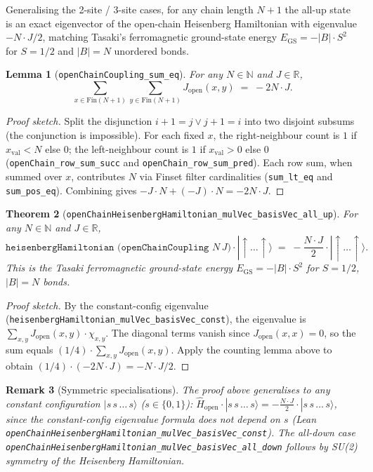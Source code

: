 \documentclass[a4paper,11pt]{article}
\newtheorem{theorem}{Theorem}
\newtheorem{lemma}[theorem]{Lemma}
\newtheorem{remark}[theorem]{Remark}
\begin{document}
Generalising the 2-site / 3-site cases, for any chain length
$N + 1$ the all-up state is an exact eigenvector of the open-chain
Heisenberg Hamiltonian with eigenvalue $-N\cdot J/2$, matching
Tasaki's ferromagnetic ground-state energy
$E_{\mathrm{GS}} = -|B|\cdot S^{2}$ for $S = 1/2$ and $|B| = N$
unordered bonds.

\begin{lemma}[\texttt{openChainCoupling\_sum\_eq}]
For any $N \in \mathbb{N}$ and $J \in \mathbb{R}$,
\[
  \sum_{x \in \mathrm{Fin}(N+1)} \sum_{y \in \mathrm{Fin}(N+1)}
    J_{\mathrm{open}}(x,y) \;=\; -2N\cdot J.
\]
\end{lemma}

\begin{proof}[Proof sketch]
Split the disjunction $i+1 = j \lor j+1 = i$ into two disjoint
subsums (the conjunction is impossible).  For each fixed $x$, the
right-neighbour count is $1$ if $x_{\mathrm{val}} < N$ else $0$; the
left-neighbour count is $1$ if $x_{\mathrm{val}} > 0$ else $0$
(\texttt{openChain\_row\_sum\_succ} and \texttt{openChain\_row\_sum\_pred}).
Each row sum, when summed over $x$, contributes $N$ via Finset
filter cardinalities (\texttt{sum\_lt\_eq} and \texttt{sum\_pos\_eq}).
Combining gives $-J\cdot N + (-J)\cdot N = -2N\cdot J$.
\end{proof}

\begin{theorem}[\texttt{openChainHeisenbergHamiltonian\_mulVec\_basisVec\_all\_up}]
For any $N \in \mathbb{N}$ and $J \in \mathbb{R}$,
\[
  \texttt{heisenbergHamiltonian (openChainCoupling }N\, J)
    \cdot |{\uparrow}\dots{\uparrow}\rangle
  \;=\; -\frac{N\cdot J}{2}\cdot
    |{\uparrow}\dots{\uparrow}\rangle.
\]
This is the Tasaki ferromagnetic ground-state energy
$E_{\mathrm{GS}} = -|B|\cdot S^{2}$ for $S = 1/2$, $|B| = N$ bonds.
\end{theorem}

\begin{proof}[Proof sketch]
By the constant-config eigenvalue
(\texttt{heisenbergHamiltonian\_mulVec\_basisVec\_const}), the
eigenvalue is $\sum_{x,y} J_{\mathrm{open}}(x,y)\cdot \chi_{x,y}$.
The diagonal terms vanish since $J_{\mathrm{open}}(x,x) = 0$, so the
sum equals $(1/4)\cdot \sum_{x,y} J_{\mathrm{open}}(x,y)$. Apply the
counting lemma above to obtain $(1/4)\cdot (-2N\cdot J) = -N\cdot J/2$.
\end{proof}

\begin{remark}[Symmetric specialisations]
The proof above generalises to any constant configuration
$|s\,s\,\dots\,s\rangle$ ($s \in \{0,1\}$):
$\hat H_{\mathrm{open}}\cdot|s\,s\,\dots\,s\rangle = -\tfrac{N\cdot J}{2}
\cdot|s\,s\,\dots\,s\rangle$, since the constant-config eigenvalue
formula does not depend on $s$ (Lean
\texttt{openChainHeisenbergHamiltonian\_mulVec\_basisVec\_const}).
The all-down case
\texttt{openChainHeisenbergHamiltonian\_mulVec\_basisVec\_all\_down}
follows by SU(2) symmetry of the Heisenberg Hamiltonian.
\end{remark}
\end{document}

